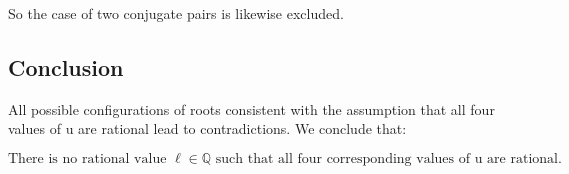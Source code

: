 \documentclass[11pt, a4paper]{article}
\newcommand{\ur}{\mathrm{u}}
\numberwithin{equation}{section}
\begin{document}
So the case of two conjugate pairs is likewise excluded.

\subsection*{Conclusion}

All possible configurations of roots consistent with the assumption that all four values of \(\ur\) are rational lead to contradictions. We conclude that:

\begin{equation}
\boxed{
\text{There is no rational value } \ell\in \mathbb{Q}
\text{ such that all four corresponding values of } \ur \text{ are rational.}
}
\end{equation}



\printbibliography[title={References}]
\end{document}
